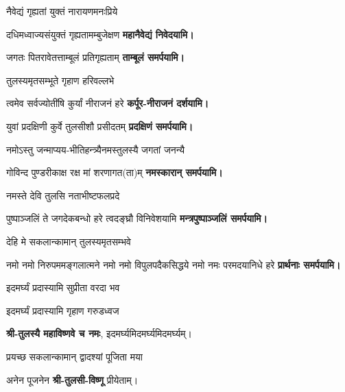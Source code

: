 \begin{center}
{नैवेद्यं गृह्यतां युक्तं नारायणमनःप्रिये}

{दधिमध्वाज्यसंयुक्तं गृह्यतामम्बुजेक्षण}
\textbf{\devAya{} महानैवेद्यं निवेदयामि।}
\medskip

{जगतः पितरावेतत्ताम्बूलं प्रतिगृह्यताम्}
\textbf{\devAya{} ताम्बूलं समर्पयामि।}
\medskip

{तुलस्यमृतसम्भूते गृहाण हरिवल्लभे}

{त्वमेव सर्वज्योतींषि कुर्यां नीराजनं हरे}
\textbf{\devAya{} कर्पूर-नीराजनं दर्शयामि।}
\medskip

{युवां प्रदक्षिणी कुर्वे तुलसीशौ प्रसीदतम्}
\textbf{\devAya{} प्रदक्षिणं समर्पयामि।}
\medskip

{नमोऽस्तु जन्माप्यय-भीतिहन्त्र्यै}{नमस्तुलस्यै जगतां जनन्यै}

{गोविन्द पुण्डरीकाक्ष रक्ष मां शरणागत(ता)म्}
\textbf{\devAya{} नमस्कारान् समर्पयामि।}
\medskip

{नमस्ते देवि तुलसि नताभीष्टफलप्रदे}

{पुष्पाञ्जलिं ते जगदेकबन्धो हरे त्वदङ्घ्रौ विनिवेशयामि}
\textbf{\devAya{} मन्त्रपुष्पाञ्जलिं समर्पयामि।}
\medskip

{देहि मे सकलान्कामान् तुलस्यमृतसम्भवे}

{नमो नमो निरुपममङ्गलात्मने}
{नमो नमो विपुलपदैकसिद्धये}
{नमो नमः परमदयानिधे हरे}
\nopagebreak[4]\textbf{\devAya{} प्रार्थनाः समर्पयामि।}
\medskip

{इदमर्घ्यं प्रदास्यामि सुप्रीता वरदा भव}

{इदमर्घ्यं प्रदास्यामि गृहाण गरुडध्वज}

\textbf{श्री-तुलस्यै महाविष्णवे च नमः}, इदमर्घ्यमिदमर्घ्यमिदमर्घ्यम्।

{प्रयच्छ सकलान्कामान् द्वादश्यां पूजिता मया}


अनेन पूजनेन \textbf{श्री-तुलसी-विष्णू} प्रीयेताम्।\\

\end{center}

